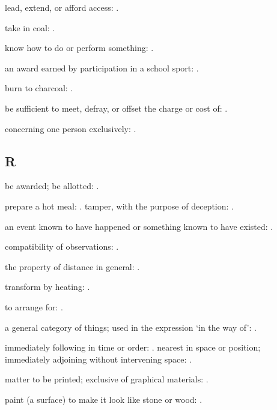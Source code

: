   lead, extend, or afford access:   .

  take in coal: .

  know how to do or perform something: .

  an award earned by participation in a school sport:   .

  burn to charcoal:   .

  be sufficient to meet, defray, or offset the charge or cost of: .

  concerning one person exclusively:   .

\subsection*{R}

  be awarded; be allotted: .

  prepare a hot meal: . tamper, with the purpose of deception:   .

  an event known to have happened or something known to have existed: .

  compatibility of observations:   .

  the property of distance in general: .

  transform by heating: .

  to arrange for: .

  a general category of things; used in the expression `in the way of': .

  immediately following in time or order:   . nearest in space or position; immediately adjoining without intervening space:   .

  matter to be printed; exclusive of graphical materials:   .

  paint (a surface) to make it look like stone or wood: .

